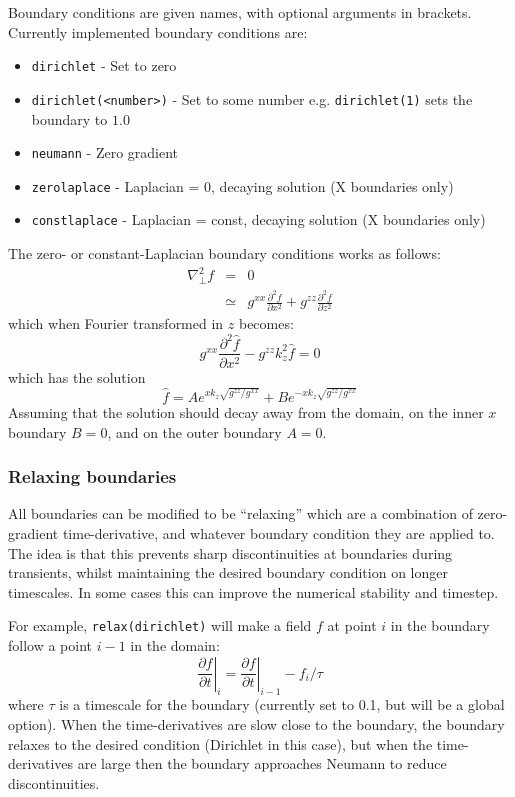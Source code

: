 \documentclass[12pt]{article}
\newcommand{\code}[1]{\texttt{#1}}
\newcommand{\deriv}[2]{\ensuremath{\frac{\partial #1}{\partial #2}}}
\begin{document}
Boundary conditions are given names, with optional arguments in brackets. 
Currently implemented boundary conditions are:
\begin{itemize}
\item \code{dirichlet} - Set to zero
\item \code{dirichlet(<number>)} - Set to some number e.g. \code{dirichlet(1)}
sets the boundary to $1.0$
\item \code{neumann} - Zero gradient
\item \code{zerolaplace} - Laplacian = 0, decaying solution (X boundaries only)
\item \code{constlaplace} - Laplacian = const, decaying solution (X boundaries only)
\end{itemize}
The zero- or constant-Laplacian boundary conditions works as follows:
\begin{eqnarray*}
\nabla_\perp^2 f &=& 0 \\
&\simeq& g^{xx}\frac{\partial^2 f}{\partial x^2} + g^{zz}\frac{\partial^2 f}{\partial z^2}
\end{eqnarray*}
which when Fourier transformed in $z$ becomes: 
\[
g^{xx}\frac{\partial^2 \hat{f}}{\partial x^2} - g^{zz}k_z^2 \hat{f} = 0
\]
which has the solution
\[
\hat{f} = Ae^{xk_z\sqrt{g^{zz}/g^{xx}}} + Be^{-xk_z\sqrt{g^{zz}/g^{xx}}}
\]
Assuming that the solution should decay away from the domain, on the inner
$x$ boundary $B = 0$, and on the outer boundary $A = 0$. 

\subsubsection{Relaxing boundaries}

All boundaries can be modified to be ``relaxing'' which are a combination
of zero-gradient time-derivative, and whatever boundary condition they are
applied to. The idea is that this prevents sharp discontinuities at boundaries
during transients, whilst maintaining the desired boundary condition on
longer timescales. In some cases this can improve the numerical stability
and timestep.

For example, \code{relax(dirichlet)} will make a field $f$ at point $i$ in the
boundary follow a point $i-1$ in the domain:
\[
\left.\deriv{f}{t}\right|_i = \left.\deriv{f}{t}\right|_{i-1}  - f_i / \tau
\]
where $\tau$ is a timescale for the boundary (currently set to 0.1, but will
be a global option).
When the time-derivatives are slow close to the boundary, the boundary
relaxes to the desired condition (Dirichlet in this case), but when the
time-derivatives are large then the boundary approaches Neumann to reduce
discontinuities.
\end{document}
